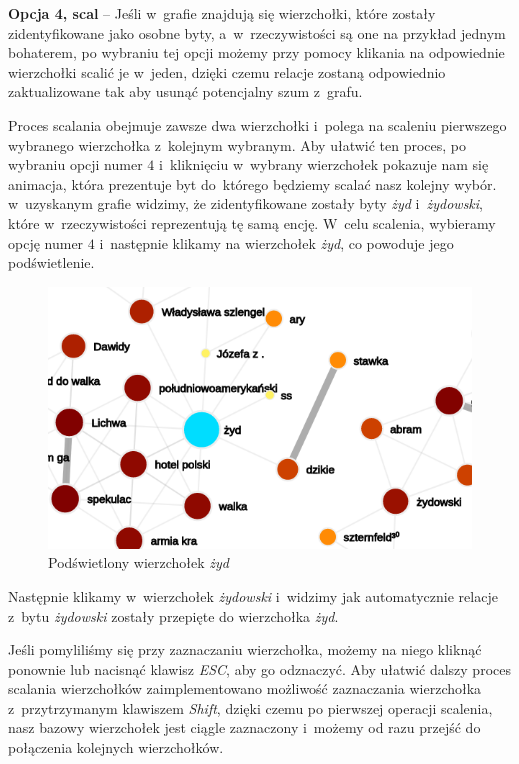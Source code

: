 \documentclass[12pt, a4paper]{article}
\begin{document}
\noindent \textbf{Opcja 4, scal} -- Jeśli w~grafie znajdują się wierzchołki, które zostały zidentyfikowane jako osobne byty, a~w~rzeczywistości są one na przykład jednym bohaterem, po wybraniu tej opcji możemy przy pomocy klikania na odpowiednie wierzchołki scalić je w~jeden, dzięki czemu relacje zostaną odpowiednio zaktualizowane tak aby usunąć potencjalny szum z~grafu.

Proces scalania obejmuje zawsze dwa wierzchołki i~polega na scaleniu pierwszego wybranego wierzchołka z~kolejnym wybranym. Aby ułatwić ten proces, po wybraniu opcji numer $4$ i~kliknięciu w~wybrany wierzchołek pokazuje nam się animacja, która prezentuje byt do~którego będziemy scalać nasz kolejny wybór. w~uzyskanym grafie widzimy, że zidentyfikowane zostały byty \textit{żyd} i~\textit{żydowski}, które w~rzeczywistości reprezentują tę samą encję. W~celu scalenia, wybieramy opcję numer $4$ i~następnie klikamy na wierzchołek \textit{żyd}, co powoduje jego podświetlenie.

\begin{figure}[H]
  \centering
  \includegraphics[width=0.7\linewidth]{images/graph-jew-highlight.png}
  \caption{Podświetlony wierzchołek \textit{żyd}}
\end{figure}

Następnie klikamy w~wierzchołek \textit{żydowski} i~widzimy jak automatycznie relacje z~bytu \textit{żydowski} zostały przepięte do wierzchołka \textit{żyd}.

Jeśli pomyliliśmy się przy zaznaczaniu wierzchołka, możemy na niego kliknąć ponownie lub nacisnąć klawisz \textit{ESC}, aby go odznaczyć. Aby ułatwić dalszy proces scalania wierzchołków zaimplementowano możliwość zaznaczania wierzchołka z~przytrzymanym klawiszem \textit{Shift}, dzięki czemu po pierwszej operacji scalenia, nasz bazowy wierzchołek jest ciągle zaznaczony i~możemy od razu przejść do połączenia kolejnych wierzchołków.\\
\end{document}
